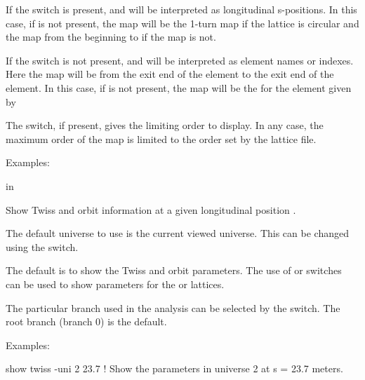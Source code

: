 {{{\begin{description}
{If the  switch is present,  and  will be
interpreted as longitudinal s-positions. In this case, if  is
not present, the map will be the 1-turn map if the lattice is circular
and the map from the beginning to  if the map is not.

If the  switch is not present,  and  will be
interpreted as element names or indexes. Here the map will be from the
exit end of the  element to the exit end of the 
element. In this case, if  is not present, the map will be
the for the element given by 

The  switch, if present, gives the limiting order to
display. In any case, the maximum order of the map is limited to the
order set by the lattice file.

Examples:


 in

\item[\protect\parbox{6in}{
    show twiss\_and\_orbit \{-base\} \{-branch <name>\} \{-design\} \\
    \hspace*{0.35in} \{-universe <ix\_uni>\} <s\_position>}] \Newline

\vskip -0.1in

Show Twiss and orbit information at a given longitudinal position . 

The default universe to use is the current viewed universe. This can
be changed using the  switch.

The default is to show the  Twiss and orbit parameters. The
use of  or  switches can be used to show
parameters for the  or  lattices.

The particular branch used in the analysis can be selected by the
 switch. The root branch (branch 0) is the default.

Examples:
\begin{example}
  show twiss -uni 2 23.7     ! Show the parameters in universe 2 at s = 23.7 meters.
\end{example} 

}
\end{description}}}}
